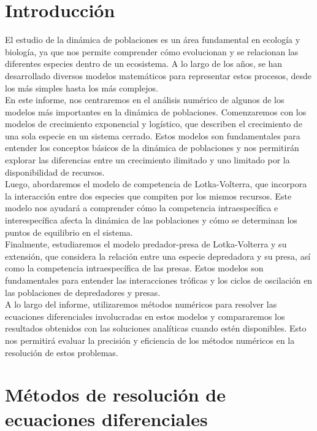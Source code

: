 \documentclass[12pt,a4]{article} %
\begin{document}
\begin{multicols}{2}
\raggedcolumns

\section{Introducción}
 El estudio de la dinámica de poblaciones es un área fundamental en ecología y biología, ya que nos permite comprender cómo evolucionan y se relacionan las diferentes especies dentro de un ecosistema. A lo largo de los años, se han desarrollado diversos modelos matemáticos para representar estos procesos, desde los más simples hasta los más complejos.\\
 
 En este informe, nos centraremos en el análisis numérico de algunos de los modelos más importantes en la dinámica de poblaciones. Comenzaremos con los modelos de crecimiento exponencial y logístico, que describen el crecimiento de una sola especie en un sistema cerrado. Estos modelos son fundamentales para entender los conceptos básicos de la dinámica de poblaciones y nos permitirán explorar las diferencias entre un crecimiento ilimitado y uno limitado por la disponibilidad de recursos.\\
 
 Luego, abordaremos el modelo de competencia de Lotka-Volterra, que incorpora la interacción entre dos especies que compiten por los mismos recursos. Este modelo nos ayudará a comprender cómo la competencia intraespecífica e interespecífica afecta la dinámica de las poblaciones y cómo se determinan los puntos de equilibrio en el sistema.\\
 
 Finalmente, estudiaremos el modelo predador-presa de Lotka-Volterra y su extensión, que considera la relación entre una especie depredadora y su presa, así como la competencia intraespecífica de las presas. Estos modelos son fundamentales para entender las interacciones tróficas y los ciclos de oscilación en las poblaciones de depredadores y presas.\\
 
 A lo largo del informe, utilizaremos métodos numéricos para resolver las ecuaciones diferenciales involucradas en estos modelos y compararemos los resultados obtenidos con las soluciones analíticas cuando estén disponibles. Esto nos permitirá evaluar la precisión y eficiencia de los métodos numéricos en la resolución de estos problemas.
\section{Métodos de resolución de ecuaciones diferenciales}


\end{multicols}
\end{document}

